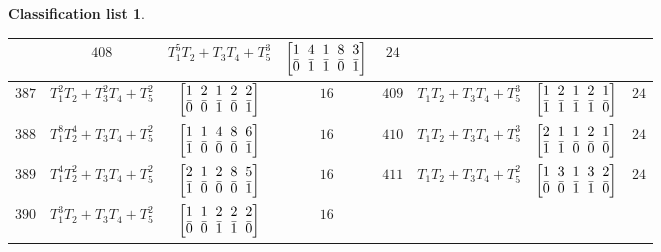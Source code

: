 \documentclass[10pt,a4paper]{amsart}
\theoremstyle{definition}
\newtheorem{class-list}[thm]{Classification list}
\numberwithin{equation}{section}
\begin{document}
\begin{class-list}
\begin{table}[h!]
\begin{tabu}{c|c|c|c||c|c|c|c}
&${408}$&${T_{1}^{5}T_{2}+T_{3}T_{4}+T_{5}^{3}}$
&$\arraycolsep=1mm\begin{bmatrix}{1} & {4} & {1} & {8} & {3} \\ {\bar{0}} & {\bar{1}} & {\bar{1}} & {\bar{0}} & {\bar{1}}\end{bmatrix}$&${24}$
\\
\hline
${387}$&${T_{1}^{2}T_{2}+T_{3}^{2}T_{4}+T_{5}^{2}}$
&$\arraycolsep=1mm\begin{bmatrix}{1} & {2} & {1} & {2} & {2} \\ {\bar{0}} & {\bar{0}} & {\bar{1}} & {\bar{0}} & {\bar{1}}\end{bmatrix}$&${16}$
&${409}$&${T_{1}T_{2}+T_{3}T_{4}+T_{5}^{3}}$
&$\arraycolsep=1mm\begin{bmatrix}{1} & {2} & {1} & {2} & {1} \\ {\bar{1}} & {\bar{1}} & {\bar{1}} & {\bar{1}} & {\bar{0}}\end{bmatrix}$&${24}$
\\
\hline
${388}$&${T_{1}^{8}T_{2}^{4}+T_{3}T_{4}+T_{5}^{2}}$
&$\arraycolsep=1mm\begin{bmatrix}{1} & {1} & {4} & {8} & {6} \\ {\bar{1}} & {\bar{0}} & {\bar{0}} & {\bar{0}} & {\bar{1}}\end{bmatrix}$&${16}$
&${410}$&${T_{1}T_{2}+T_{3}T_{4}+T_{5}^{3}}$
&$\arraycolsep=1mm\begin{bmatrix}{2} & {1} & {1} & {2} & {1} \\ {\bar{1}} & {\bar{1}} & {\bar{0}} & {\bar{0}} & {\bar{0}}\end{bmatrix}$&${24}$
\\
\hline
${389}$&${T_{1}^{4}T_{2}^{2}+T_{3}T_{4}+T_{5}^{2}}$
&$\arraycolsep=1mm\begin{bmatrix}{2} & {1} & {2} & {8} & {5} \\ {\bar{1}} & {\bar{0}} & {\bar{0}} & {\bar{0}} & {\bar{1}}\end{bmatrix}$&${16}$
&${411}$&${T_{1}T_{2}+T_{3}T_{4}+T_{5}^{2}}$
&$\arraycolsep=1mm\begin{bmatrix}{1} & {3} & {1} & {3} & {2} \\ {\bar{0}} & {\bar{0}} & {\bar{1}} & {\bar{1}} & {\bar{0}}\end{bmatrix}$&${24}$
\\
\hline
${390}$&${T_{1}^{3}T_{2}+T_{3}T_{4}+T_{5}^{2}}$
&$\arraycolsep=1mm\begin{bmatrix}{1} & {1} & {2} & {2} & {2} \\ {\bar{0}} & {\bar{0}} & {\bar{1}} & {\bar{1}} & {\bar{0}}\end{bmatrix}$&${16}$
\\
\end{tabu}%
\end{table}
\end{class-list}
\end{document}
